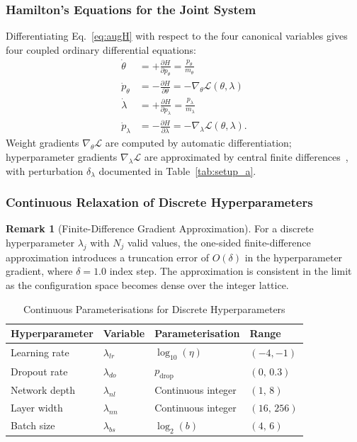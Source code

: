 \documentclass[11pt]{article}
\theoremstyle{definition}
\newtheorem{remark}[theorem]{Remark}
\begin{document}
\subsubsection{Hamilton's Equations for the Joint System}

Differentiating Eq.~\eqref{eq:augH} with respect to the four
canonical variables gives four coupled ordinary differential
equations:
\begin{align}
\dot\theta      &= +\frac{\partial H}{\partial p_\theta}
                 = \frac{p_\theta}{m_\theta}
\label{eq:heq1}\\
\dot{p}_\theta  &= -\frac{\partial H}{\partial \theta}
                 = -\nabla_\theta\mathcal{L}(\theta,\lambda)
\label{eq:heq2}\\
\dot\lambda     &= +\frac{\partial H}{\partial p_\lambda}
                 = \frac{p_\lambda}{m_\lambda}
\label{eq:heq3}\\
\dot{p}_\lambda &= -\frac{\partial H}{\partial \lambda}
                 = -\nabla_\lambda\mathcal{L}(\theta,\lambda).
\label{eq:heq4}
\end{align}
Weight gradients $\nabla_\theta\mathcal{L}$ are computed by automatic
differentiation; hyperparameter gradients $\nabla_\lambda\mathcal{L}$
are approximated by central finite differences~\cite{rathore2024},
with perturbation $\delta_\lambda$ documented in
Table~\ref{tab:setup_a}.

\subsubsection{Continuous Relaxation of Discrete Hyperparameters}

\begin{remark}[Finite-Difference Gradient Approximation]
\label{rem:fd}
For a discrete hyperparameter $\lambda_j$ with $N_j$ valid values,
the one-sided finite-difference approximation introduces a
truncation error of $O(\delta)$ in the hyperparameter gradient, where
$\delta=1.0$ index step. The approximation is consistent in the
limit as the configuration space becomes dense over the integer
lattice.
\end{remark}

\begin{table}[H]
\centering
\caption{Continuous Parameterisations for Discrete Hyperparameters}
\label{tab:hpparam}
\renewcommand{\arraystretch}{1.2}
\begin{tabular}{llll}
\toprule
Hyperparameter & Variable & Parameterisation & Range \\
\midrule
Learning rate  & $\lambda_{lr}$ & $\log_{10}(\eta)$    & $(-4,-1)$ \\
Dropout rate   & $\lambda_{do}$ & $p_{\mathrm{drop}}$  & $(0,\,0.3)$ \\
Network depth  & $\lambda_{nl}$ & Continuous integer   & $(1,\,8)$ \\
Layer width    & $\lambda_{nn}$ & Continuous integer   & $(16,\,256)$ \\
Batch size     & $\lambda_{bs}$ & $\log_2(b)$          & $(4,\,6)$ \\
\bottomrule
\end{tabular}
\end{table}
\end{document}
